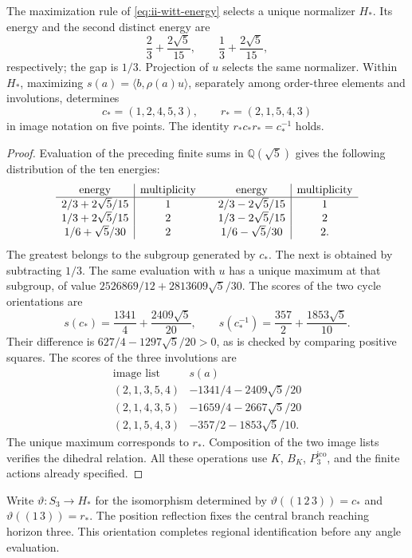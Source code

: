 \begin{proposition}
\label{prop:ii-witt-variational-selection}
The maximization rule of \eqref{eq:ii-witt-energy} selects a unique
normalizer \(H_*\). Its energy and the second distinct energy are
\[
 \frac23+\frac{2\sqrt5}{15},\qquad
 \frac13+\frac{2\sqrt5}{15},
\]
respectively; the gap is \(1/3\). Projection of \(u\)
selects the same normalizer. Within \(H_*\), maximizing
\(s(a)=\langle b,\rho(a)u\rangle\), separately among order-three
elements and involutions, determines
\[
 c_*=(1,2,4,5,3),\qquad r_*=(2,1,5,4,3)
\]
in image notation on five points. The identity
\(r_*c_*r_*=c_*^{-1}\) holds.
\end{proposition}
\begin{proof}
Evaluation of the preceding finite sums in \(\mathbb Q(\sqrt5)\)
gives the following distribution of the ten energies:
\[
\begin{array}{c|c@{\qquad}c|c}
\text{energy}&\text{multiplicity}&\text{energy}&\text{multiplicity}\\ \hline
2/3+2\sqrt5/15&1&2/3-2\sqrt5/15&1\\
1/3+2\sqrt5/15&2&1/3-2\sqrt5/15&2\\
1/6+\sqrt5/30&2&1/6-\sqrt5/30&2.
\end{array}
\]
The greatest belongs to the subgroup generated by \(c_*\). The next is
obtained by subtracting \(1/3\). The same evaluation with \(u\) has a unique
maximum at that subgroup, of value
\(2526869/12+2813609\sqrt5/30\).
The scores of the two cycle orientations are
\[
 s(c_*)=\frac{1341}{4}+\frac{2409\sqrt5}{20},\qquad
 s(c_*^{-1})=\frac{357}{2}+\frac{1853\sqrt5}{10}.
\]
Their difference is \(627/4-1297\sqrt5/20>0\), as is checked
by comparing positive squares. The scores of the three
involutions are
\[
\begin{array}{c|c}
\text{image list}&s(a)\\ \hline
(2,1,3,5,4)&-1341/4-2409\sqrt5/20\\
(2,1,4,3,5)&-1659/4-2667\sqrt5/20\\
(2,1,5,4,3)&-357/2-1853\sqrt5/10.
\end{array}
\]
The unique maximum corresponds to \(r_*\). Composition of the two image
lists verifies the dihedral relation. All these operations use
\(K\), \(B_K\), \(P_3^{\mathrm{ico}}\), and the finite actions already specified.
\end{proof}

Write \(\vartheta:S_3\to H_*\) for the isomorphism determined
by \(\vartheta((1\,2\,3))=c_*\) and
\(\vartheta((1\,3))=r_*\). The position reflection fixes the central
branch reaching horizon three. This orientation completes
regional identification before any angle evaluation.

